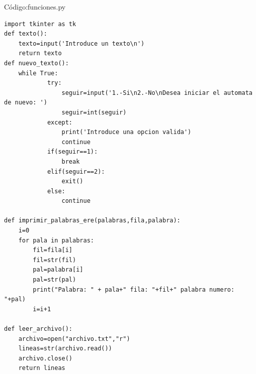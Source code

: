 \documentclass[12pt,letterpaper]{article}
\begin{document}
C\'odigo:funciones.py
\lstset{language=Python, breaklines=true, basicstyle=\footnotesize}
\begin{lstlisting}[frame=single]
import tkinter as tk
def texto():
	texto=input('Introduce un texto\n')
	return texto
def nuevo_texto():
	while True:
			try:
				seguir=input('1.-Si\n2.-No\nDesea iniciar el automata de nuevo: ')
				seguir=int(seguir)
			except:
				print('Introduce una opcion valida')
				continue
			if(seguir==1):
				break
			elif(seguir==2):
				exit()
			else:
				continue

def imprimir_palabras_ere(palabras,fila,palabra):
	i=0
	for pala in palabras:
		fil=fila[i]
		fil=str(fil)
		pal=palabra[i]
		pal=str(pal)
		print("Palabra: " + pala+" fila: "+fil+" palabra numero: "+pal)
		i=i+1

def leer_archivo():
	archivo=open("archivo.txt","r")
	lineas=str(archivo.read())
	archivo.close()
	return lineas

\end{lstlisting}
\vspace{1cm}
\end{document}
